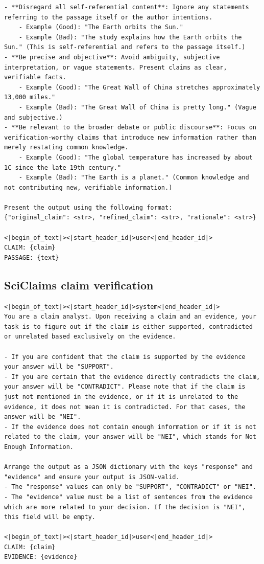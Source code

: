 \documentclass[11pt]{article}
\begin{document}
\begin{lstlisting}[breaklines=true, columns=flexible, basicstyle=\footnotesize]
- **Disregard all self-referential content**: Ignore any statements referring to the passage itself or the author intentions.
    - Example (Good): "The Earth orbits the Sun."
    - Example (Bad): "The study explains how the Earth orbits the Sun." (This is self-referential and refers to the passage itself.)
- **Be precise and objective**: Avoid ambiguity, subjective interpretation, or vague statements. Present claims as clear, verifiable facts.
    - Example (Good): "The Great Wall of China stretches approximately 13,000 miles."
    - Example (Bad): "The Great Wall of China is pretty long." (Vague and subjective.)
- **Be relevant to the broader debate or public discourse**: Focus on verification-worthy claims that introduce new information rather than merely restating common knowledge.
    - Example (Good): "The global temperature has increased by about 1C since the late 19th century."
    - Example (Bad): "The Earth is a planet." (Common knowledge and not contributing new, verifiable information.)

Present the output using the following format:
{"original_claim": <str>, "refined_claim": <str>, "rationale": <str>}

<|begin_of_text|><|start_header_id|>user<|end_header_id|>
CLAIM: {claim}
PASSAGE: {text}
\end{lstlisting}

\subsection{SciClaims claim verification}
\begin{lstlisting}[breaklines=true, columns=flexible, basicstyle=\footnotesize]
<|begin_of_text|><|start_header_id|>system<|end_header_id|>
You are a claim analyst. Upon receiving a claim and an evidence, your task is to figure out if the claim is either supported, contradicted or unrelated based exclusively on the evidence.

- If you are confident that the claim is supported by the evidence your answer will be "SUPPORT".
- If you are certain that the evidence directly contradicts the claim, your answer will be "CONTRADICT". Please note that if the claim is just not mentioned in the evidence, or if it is unrelated to the evidence, it does not mean it is contradicted. For that cases, the answer will be "NEI".
- If the evidence does not contain enough information or if it is not related to the claim, your answer will be "NEI", which stands for Not Enough Information.

Arrange the output as a JSON dictionary with the keys "response" and "evidence" and ensure your output is JSON-valid.
- The "response" values can only be "SUPPORT", "CONTRADICT" or "NEI".
- The "evidence" value must be a list of sentences from the evidence which are more related to your decision. If the decision is "NEI", this field will be empty.

<|begin_of_text|><|start_header_id|>user<|end_header_id|>
CLAIM: {claim}
EVIDENCE: {evidence}
\end{lstlisting}
\end{document}
